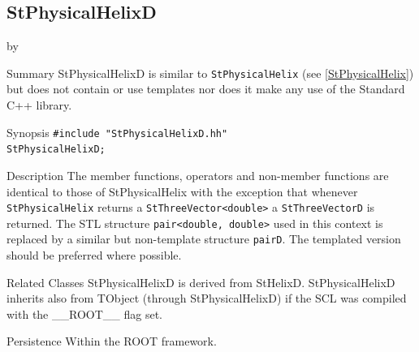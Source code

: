 \documentclass[twoside]{article}
\newcommand{\name}[1]{\textsf{#1}}%
\newcommand{\entrylabel}[1]{\mbox{\textbf{{#1}}}\hfil}%
\newenvironment{entry}
{\begin{list}{}%
    {\renewcommand{\makelabel}{\entrylabel}%
     \setlength{\labelwidth}{90pt}%
     \setlength{\leftmargin}{\labelwidth}
     \advance\leftmargin by \labelsep%
      }%
    }%
  {\end{list}}
\newcommand{\Entrylabel}[1]%
{\raisebox{0pt}[1ex][0pt]{\makebox[\labelwidth][l]%
    {\parbox[t]{\labelwidth}{\hspace{0pt}\textbf{{#1}}}}}}
\newenvironment{Entry}%
{\renewcommand{\entrylabel}{\Entrylabel}\begin{entry}}%
  {\end{entry}}
\begin{document}
\subsection{StPhysicalHelixD } \label{StPhysicalHelixD}
\begin{Entry}
\item[Summary]
    StPhysicalHelixD is similar to \texttt{StPhysicalHelix}
    (see \ref{StPhysicalHelix}) but does not contain or use templates nor
    does it make any use of the Standard C++ library. 
    
\item[Synopsis]
    \verb+#include "StPhysicalHelixD.hh"+ \\
    \verb+StPhysicalHelixD;+
    
    
\item[Description]       
    The member functions, operators and non-member functions are identical
    to those of StPhysicalHelix with the exception that whenever \texttt{StPhysicalHelix} returns a
    \verb+StThreeVector<double>+ a \texttt{StThreeVectorD} is returned.
    The STL structure \verb+pair<double, double>+ used in this context is replaced
    by a similar but non-template structure \texttt{pairD}. 
    The templated version should be preferred where possible.

\item[Related Classes]
    StPhysicalHelixD is derived from StHelixD.
    StPhysicalHelixD inherits also from TObject (through StPhysicalHelixD) 
    if the SCL was compiled with the \name{\_\_ROOT\_\_} flag set.
    
\item[Persistence]
    Within the ROOT framework.

\end{Entry}


\clearpage

%
%
\end{document}
